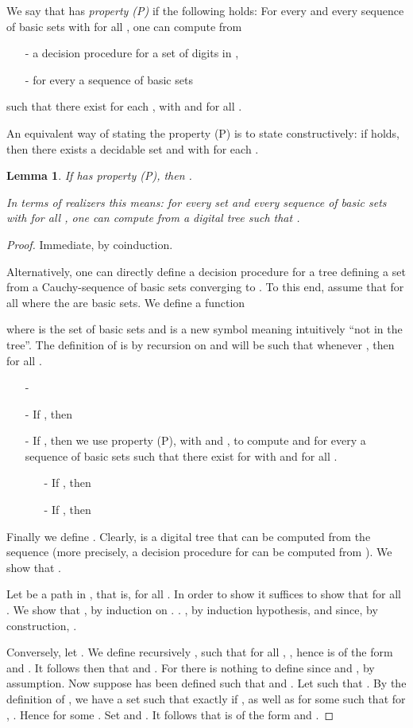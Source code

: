 \documentclass[microtype]{jloganal}
\theoremstyle{plain}
\newtheorem{lemma}[theorem]{Lemma}
\theoremstyle{definition}
\begin{document}
We say that  has \emph{property (P)} if the 
following holds: For every  and every sequence 
 of basic sets
with  for all , one can compute from 
\begin{itemize}
\item[-] a decision procedure for a set  of digits in ,
\item[-] for every  a sequence of basic sets 
\end{itemize}
such that there exist  for each , with
 and  for all 
.

An equivalent way of stating the property (P) is to state constructively: 
if  holds, then there exists a decidable set 
 and  with  
for each . 

\begin{lemma}
\label{lem-p}
If  has property (P), then 
.

In terms of realizers this means: for every set  
and every sequence  of basic sets with  for all 
, one can compute from  a digital tree  such that .
\end{lemma}
\begin{proof}
Immediate, by coinduction.

Alternatively, one can directly define a decision procedure for a tree defining
a set  from a Cauchy-sequence of basic sets converging to .
To this end, assume that  for all  where the 
 are basic sets. We define a function 

where  is the set of basic sets and  is a new symbol
meaning intuitively ``not in the tree''. The definition of  is
by recursion on  and will be such that whenever 
, then  for all 
.
\begin{itemize}
\item[-] 
\item[-] If , then 
\item[-] If , then we use 
property (P), with  and , to compute 
and for every  a sequence of basic sets  such that 
there exist  for  with 
 and  for all .
\begin{itemize}
\item[-] If , then 
\item[-] If , then 
\end{itemize}
\end{itemize}
Finally we define .
Clearly,  is a digital tree that can be computed from the sequence
 (more precisely, a decision procedure for  can be
computed from ). We show that .

Let  be a path in , that is, 
 for all .
In order to show  it suffices to show
that  for all .
We show that , by induction on . 
.
, by induction hypothesis, and since,
by construction, .

Conversely, let . We define recursively ,
such that for all , , hence
 is of the form  and .
It follows then that  and .
For  there is nothing to define since 
 and , by assumption.
Now suppose  has been defined such that 
 and .
Let  such that . By the definition of ,
we have a set  such that  exactly if , 
as well as  for some 
 such that for , . 
Hence  for some . 
Set  and . It follows that 
 is of the form  and 
.
\end{proof}
\end{document}
